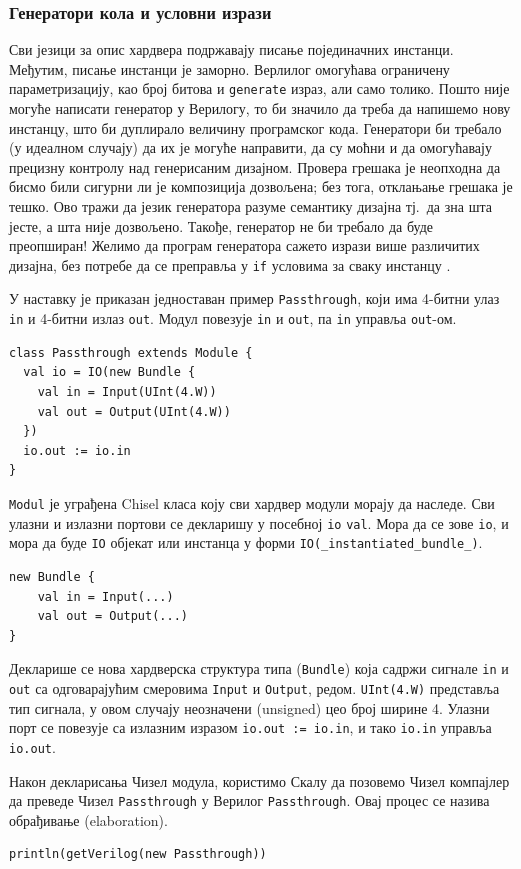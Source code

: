 \documentclass[12pt, a4paper]{article}
\theoremstyle{definition}
\begin{document}
\subsubsection{Генератори кола и условни изрази}
Сви језици за опис хардвера подржавају писање појединачних инстанци. Међутим, писање инстанци је заморно. Верлилог омогућава ограничену параметризацију, као број битова и \verb+generate+ израз, али само толико. Пошто није могуће написати генератор у Верилогу, то би значило да треба да напишемо нову инстанцу, што би дуплирало величину програмског кода.
Генератори би требало (у идеалном случају) да их је могуће направити, да су моћни и да омогућавају прецизну контролу над генерисаним дизајном. Провера грешака је неопходна да бисмо били сигурни ли је композиција дозвољена; без тога, отклањање грешака је тешко. Ово тражи да језик генератора разуме семантику дизајна тј.\ да зна шта јесте, а шта није дозвољено. Такође, генератор не би требало да буде преопширан! Желимо да програм генератора сажето изрази више различитих дизајна, без потребе да се преправља у \verb+if+ условима за сваку инстанцу \cite{git_chisel}.

У наставку је приказан једноставан пример \verb+Passthrough+, који има 4-битни улаз \verb+in+ и 4-битни излаз \verb+out+. Модул повезује \verb+in+ и \verb+out+, па \verb+in+ управља \verb+out+-ом.
\begin{verbatim}
class Passthrough extends Module {
  val io = IO(new Bundle {
    val in = Input(UInt(4.W))
    val out = Output(UInt(4.W))
  })
  io.out := io.in
}
\end{verbatim}
\verb+Modul+ је уграђена Chisel класа коју сви хардвер модули морају да наследе. Сви улазни и излазни портови се декларишу у посебној \verb+io+ \verb+val+. Мора да се зове \verb+io+, и мора да буде \verb+IO+ објекат или инстанца у форми \verb+IO(_instantiated_bundle_)+.
\begin{verbatim}
new Bundle {
    val in = Input(...)
    val out = Output(...)
}
\end{verbatim}

Декларише се нова хардверска структура типа (\verb+Bundle+) која садржи сигнале \verb+in+ и \verb+out+ са одговарајућим смеровима \verb+Input+ и \verb+Output+, редом. \verb+UInt(4.W)+ представља тип сигнала, у овом случају неозначени (unsigned) цео број ширине 4. Улазни порт се повезује са излазним изразом \verb+io.out := io.in+, и тако \verb+io.in+ управља \verb+io.out+.

Након декларисања Чизел модула, користимо Скалу да позовемо Чизел компајлер да преведе Чизел \verb+Passthrough+ у Верилог \verb+Passthrough+. Овај процес се назива обрађивање (elaboration).
\begin{verbatim}
println(getVerilog(new Passthrough))
\end{verbatim}
\end{document}
